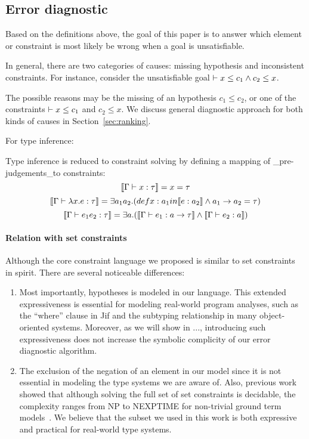 \subsection{Error diagnostic}

Based on the definitions above, the goal of this paper is to answer which
element or constraint is most likely be wrong when a goal is unsatisfiable. 

In general, there are two categories of causes: missing hypothesis and
inconsistent constraints. For instance, consider the unsatisfiable goal
$\vdash x \leq c_1 \land c_2 \leq x$.

The possible reasons may be the missing of an hypothesis $c_1\leq c_2$, or one
of the constraints $\vdash x \leq c_1$ and $c_2 \leq x$. We discuss general
diagnostic approach for both kinds of causes in Section~\ref{sec:ranking}.

For type inference:

Type inference is reduced to constraint solving by defining a mapping
of _pre-judgements_to constraints:
\[\llbracket \Gamma \vdash x:\tau \rrbracket = x =\tau\]
\[\llbracket \Gamma \vdash \lambda x.e:\tau \rrbracket = \exists a_1 a_2.
(def x: a_1 in \llbracket e:a_2 \rrbracket \land a_1 \rightarrow a_2 =\tau)\]
\[\llbracket \Gamma\vdash e_1 e_2 : \tau \rrbracket = \exists a.(\llbracket \Gamma \vdash
e_1:a\rightarrow \tau \rrbracket\land \llbracket \Gamma\vdash e_2:a \rrbracket)\]


\paragraph{Relation with set constraints}

Although the core constraint language we proposed is similar to set
constraints~\cite{aiken-setconstraint} in spirit. There are several
noticeable differences:

\begin{enumerate}

\item Most importantly, hypotheses is modeled in our language. This extended
expressiveness is essential for modeling real-world program analyses, such as
the ``where'' clause in Jif and the subtyping relationship in many
object-oriented systems. Moreover, as we will show in ..., introducing such
expressiveness does not increase the symbolic complicity of our error
diagnostic algorithm.

\item The exclusion of the negation of an element in our model since
it is not essential in modeling the type systems we are aware of.
Also, previous work showed that although solving the full set of set
constraints is decidable, the complexity ranges from NP to NEXPTIME
for non-trivial ground term models~\cite{aiken-complexity}. We believe
that the subset we used in this work is both expressive and practical
for real-world type systems.

\end{enumerate}

